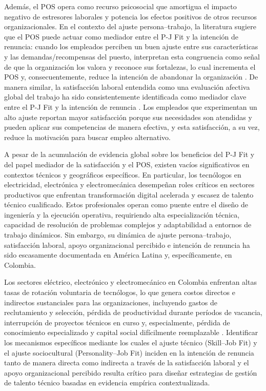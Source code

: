 Además, el POS opera como recurso psicosocial que amortigua el impacto negativo de estresores laborales y potencia los efectos positivos de otros recursos organizacionales. En el contexto del ajuste persona--trabajo, la literatura sugiere que el POS puede actuar como mediador entre el P-J Fit y la intención de renuncia: cuando los empleados perciben un buen ajuste entre sus características y las demandas/recompensas del puesto, interpretan esta congruencia como señal de que la organización los valora y reconoce sus fortalezas, lo cual incrementa el POS y, consecuentemente, reduce la intención de abandonar la organización \cite{kristofBrown2005,Cable2002}. De manera similar, la satisfacción laboral entendida como una evaluación afectiva global del trabajo ha sido consistentemente identificada como mediador clave entre el P-J Fit y la intención de renuncia \cite{kristofBrown2005}. Los empleados que experimentan un alto ajuste reportan mayor satisfacción porque sus necesidades son atendidas y pueden aplicar sus competencias de manera efectiva, y esta satisfacción, a su vez, reduce la motivación para buscar empleo alternativo.

A pesar de la acumulación de evidencia global sobre los beneficios del P-J Fit y del papel mediador de la satisfacción y el POS, existen vacíos significativos en contextos técnicos y geográficos específicos. En particular, los tecnólogos en electricidad, electrónica y electromecánica desempeñan roles críticos en sectores productivos que enfrentan transformación digital acelerada y escasez de talento técnico cualificado. Estos profesionales operan como puente entre el diseño de ingeniería y la ejecución operativa, requiriendo alta especialización técnica, capacidad de resolución de problemas complejos y adaptabilidad a entornos de trabajo dinámicos. Sin embargo, su dinámica de ajuste persona--trabajo, satisfacción laboral, apoyo organizacional percibido e intención de renuncia ha sido escasamente documentada en América Latina y, específicamente, en Colombia.

Los sectores eléctrico, electrónico y electromecánico en Colombia enfrentan altas tasas de rotación voluntaria de tecnólogos, lo que genera costos directos e indirectos sustanciales para las organizaciones, incluyendo gastos de reclutamiento y selección, pérdida de productividad durante períodos de vacancia, interrupción de proyectos técnicos en curso y, especialmente, pérdida de conocimiento especializado y capital social difícilmente reemplazable \cite{hom_structural_1991}. Identificar los mecanismos específicos mediante los cuales el ajuste técnico (Skill--Job Fit) y el ajuste sociocultural (Personality--Job Fit) inciden en la intención de renuncia tanto de manera directa como indirecta a través de la satisfacción laboral y el apoyo organizacional percibido resulta crítico para diseñar estrategias de gestión de talento técnico basadas en evidencia empírica contextualizada.

